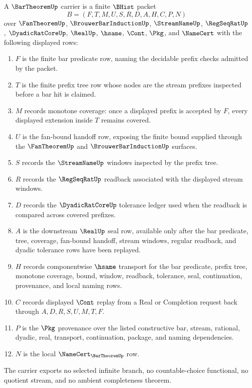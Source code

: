 \begin{definition}
\label{def:bar-theorem-carrier}
A $\BarTheoremUp$ carrier is a finite $\BHist$ packet
$$
B=(F,T,M,U,S,R,D,A,H,C,P,N)
$$
over $\FanTheoremUp$, $\BrouwerBarInductionUp$, $\StreamNameUp$, $\RegSeqRatUp$, $\DyadicRatCoreUp$, $\RealUp$, $\hsame$, $\Cont$, $\Pkg$, and $\NameCert$ with the following displayed rows:
\begin{enumerate}
\item $F$ is the finite bar predicate row, naming the decidable prefix checks admitted by the packet.
\item $T$ is the finite prefix tree row whose nodes are the stream prefixes inspected before a bar hit is claimed.
\item $M$ records monotone coverage: once a displayed prefix is accepted by $F$, every displayed extension inside $T$ remains covered.
\item $U$ is the fan-bound handoff row, exposing the finite bound supplied through the $\FanTheoremUp$ and $\BrouwerBarInductionUp$ surfaces.
\item $S$ records the $\StreamNameUp$ windows inspected by the prefix tree.
\item $R$ records the $\RegSeqRatUp$ readback associated with the displayed stream windows.
\item $D$ records the $\DyadicRatCoreUp$ tolerance ledger used when the readback is compared across covered prefixes.
\item $A$ is the downstream $\RealUp$ seal row, available only after the bar predicate, tree, coverage, fan-bound handoff, stream windows, regular readback, and dyadic tolerance rows have been replayed.
\item $H$ records componentwise $\hsame$ transport for the bar predicate, prefix tree, monotone coverage, bound, window, readback, tolerance, seal, continuation, provenance, and local naming rows.
\item $C$ records displayed $\Cont$ replay from a Real or Completion request back through $A,D,R,S,U,M,T,F$.
\item $P$ is the $\Pkg$ provenance over the listed constructive bar, stream, rational, dyadic, real, transport, continuation, package, and naming dependencies.
\item $N$ is the local $\NameCert_{\BarTheoremUp}$ row.
\end{enumerate}
The carrier exports no selected infinite branch, no countable-choice functional, no quotient stream, and no ambient completeness theorem.
\end{definition}

